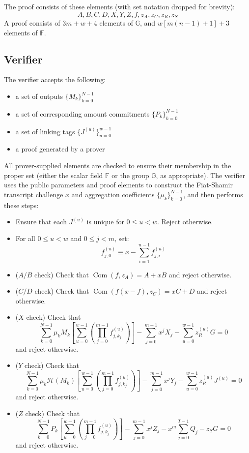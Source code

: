\documentclass[draft]{article}
\newcommand{\G}{\mathbb{G}}
\newcommand{\F}{\mathbb{F}}
\newcommand{\hp}{\mathcal{H}}
\newcommand{\com}{\operatorname{Com}}
\newcommand{\sumj}{\sum_{j=0}^{m-1}}
\newcommand{\sumk}{\sum_{k=0}^{N-1}}
\newcommand{\sumu}{\sum_{u=0}^{w-1}}
\begin{document}
The proof consists of these elements (with set notation dropped for brevity):
$$A,B,C,D,X,Y,Z,f,z_A,z_C,z_R,z_S$$
A proof consists of $3m + w + 4$ elements of $\G$, and $w\left[ m(n-1) + 1 \right] + 3$ elements of $\F$.


\subsection{Verifier}
The verifier accepts the following:
\begin{itemize}
\item a set of outputs $\{M_k\}_{k=0}^{N-1}$
\item a set of corresponding amount commitments $\{P_k\}_{k=0}^{N-1}$
\item a set of linking tags $\{J^{(u)}\}_{u=0}^{w-1}$
\item a proof generated by a prover
\end{itemize}

All prover-supplied elements are checked to ensure their membership in the proper set (either the scalar field $\F$ or the group $\G$, as appropriate).
The verifier uses the public parameters and proof elements to construct the Fiat-Shamir transcript challenge $x$ and aggregation coefficients $\{\mu_k\}_{k=0}^{N-1}$, and then performs these steps:
\begin{itemize}
\item Ensure that each $J^{(u)}$ is unique for $0 \leq u < w$.
Reject otherwise.
\item For all $0 \leq u < w$ and $0 \leq j < m$, set: $$f^{(u)}_{j,0} \equiv x - \sum_{i=1}^{n-1} f^{(u)}_{j,i}$$
\item{($A/B$ check)} Check that $\com(f,z_A) = A + xB$ and reject otherwise.
\item{($C/D$ check)} Check that $\com(f(x-f),z_C) = xC + D$ and reject otherwise.
\item{($X$ check)} Check that $$\sumk \mu_kM_k \left[ \sumu \left( \prod_{j=0}^{m-1} f^{(u)}_{j,k_j} \right) \right] - \sumj x^jX_j - \sumu z^{(u)}_RG = 0$$ and reject otherwise.
\item{($Y$ check)} Check that $$\sumk \mu_k\hp(M_k) \left[ \sumu \left( \prod_{j=0}^{m-1} f^{(u)}_{j,k_j} \right) \right] - \sumj x^jY_j - \sumu z^{(u)}_RJ^{(u)} = 0$$ and reject otherwise.
\item{($Z$ check)} Check that $$\sumk P_k \left[ \sumu \left( \prod_{j=0}^{m-1} f^{(u)}_{j,k_j} \right) \right] - \sumj x^jZ_j - x^m\sum_{j=0}^{T-1} Q_j - z_SG = 0$$ and reject otherwise.
\end{itemize}
\end{document}
